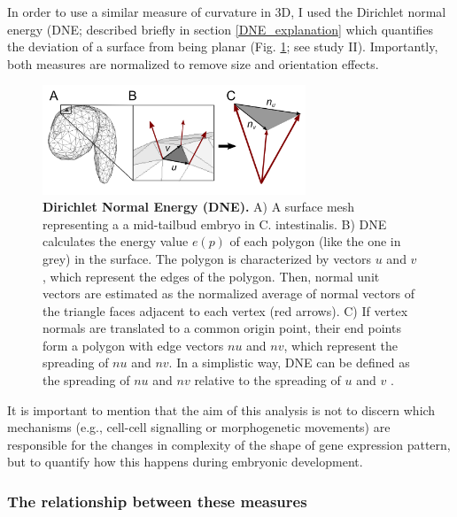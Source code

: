 In order to use a similar measure of curvature in 3D, I used the Dirichlet normal energy (DNE; described briefly in section \ref{DNE_explanation} which quantifies the deviation of a surface from being planar (Fig. \ref{fig:DNE}; see study II).
Importantly, both measures are normalized to remove size and orientation effects.

\begin{figure}[h]
  \includegraphics[width=0.7\textwidth]{./Images/DNE.png}
  \centering
  \caption{\textbf{Dirichlet Normal Energy (DNE).} A) A surface mesh representing a a mid-tailbud embryo in C. intestinalis. B) DNE calculates the energy value $e(p)$ of each polygon (like the one in grey) in the surface. The polygon is characterized by vectors $u$ and $v$, which represent the edges of the polygon. Then, normal unit vectors are estimated as the normalized average of normal vectors of the triangle faces adjacent to each vertex (red arrows). C) If vertex normals are translated to a common origin point, their end points form a polygon with edge vectors $nu$ and $nv$, which represent the spreading of $nu$ and $nv$. In a simplistic way, DNE can be defined as the spreading of $nu$ and $nv$ relative to the spreading of $u$ and $v$ \citep{Bunn2011,Winchester2016}. 
 }
  \label{fig:DNE}
\end{figure}

It is important to mention that the aim of this analysis is not to discern which mechanisms (e.g., cell-cell signalling or morphogenetic movements) are responsible for the changes in complexity of the shape of gene expression pattern, but to quantify how this happens during embryonic development.

\subsubsection{The relationship between these measures}

